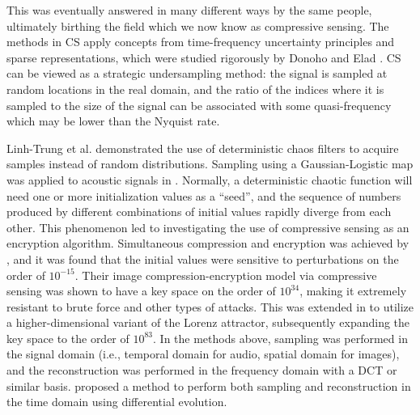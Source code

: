 \noindent This was eventually answered in many different ways by the same people, ultimately birthing the field which we now know as compressive sensing. The methods in CS apply concepts from time-frequency uncertainty principles \cite{Donoho2001} and sparse representations, which were studied rigorously by Donoho and Elad \cite{Donoho2003}. CS can be viewed as a strategic undersampling method: the signal is sampled at random locations in the real domain, and the ratio of the indices where it is sampled to the size of the signal can be associated with some quasi-frequency which may be lower than the Nyquist rate.

Linh-Trung et al. \cite{LinhTrung2008} demonstrated the use of deterministic chaos filters to acquire samples instead of random distributions. Sampling using a Gaussian-Logistic map was applied to acoustic signals in \cite{Mathew2016}. Normally, a deterministic chaotic function will need one or more initialization values as a ``seed'', and the sequence of numbers produced by different combinations of initial values rapidly diverge from each other. This phenomenon led to investigating the use of compressive sensing as an encryption algorithm. Simultaneous compression and encryption was achieved by \cite{Mo2013}, and it was found that the initial values were sensitive to perturbations on the order of $10^{-15}$. Their image compression-encryption model via compressive sensing was shown to have a key space on the order of $10^{34}$, making it extremely resistant to brute force and other types of attacks. This was extended in \cite{Zhou2016} to utilize a higher-dimensional variant of the Lorenz attractor, subsequently expanding the key space to the order of $10^{83}$. In the methods above, sampling was performed in the signal domain (i.e., temporal domain for audio, spatial domain for images), and the reconstruction was performed in the frequency domain with a DCT or similar basis. \cite{Andras2018} proposed a method to perform both sampling and reconstruction in the time domain using differential evolution.

